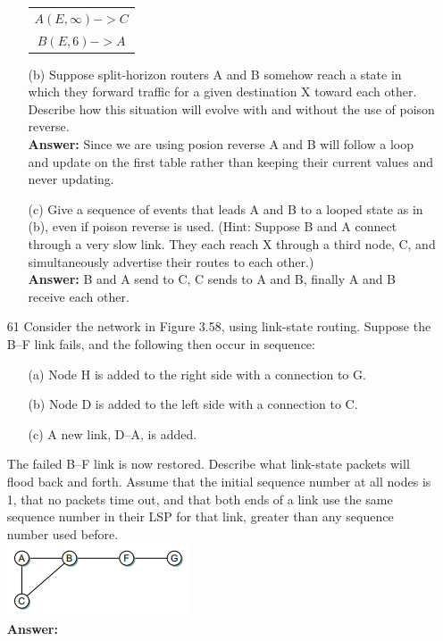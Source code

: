 \documentclass[a4paper]{article}
\begin{document}
\begin{itemize}
\begin{itemize}
\begin{tabular}{c}
	      	      	$A(E, \infty)->C$ \\
	      	      	$B(E, 6)->A$      \\
	      	      \end{tabular}
	      	\item[(b)] Suppose split-horizon routers A and B somehow reach a state in which they forward traffic for a given destination X toward each other. Describe how this situation will evolve with and without the use of poison reverse. \\
	      	      \textbf{Answer:} Since we are using posion reverse A and B will follow a loop and update on the first table rather than keeping their current values and never updating.
	      	\item[(c)] Give a sequence of events that leads A and B to a looped state as in (b), even if poison reverse is used. (Hint: Suppose B and A connect through a very slow link. They each reach X through a third node, C, and simultaneously advertise their routes to each other.) \\
	      	      \textbf{Answer:} B and A send to C, C sends to A and B, finally A and B receive each other.
	      \end{itemize}	
	\item[61] Consider the network in Figure 3.58, using link-state routing. Suppose the B–F link fails, and the following then occur in sequence:
	      \begin{itemize}
	      	\item[(a)] Node H is added to the right side with a connection to G.
	      	\item[(b)] Node D is added to the left side with a connection to C.
	      	\item[(c)] A new link, D–A, is added. 
	      \end{itemize} 
	      The failed B–F link is now restored. Describe what link-state packets will flood back and forth. Assume that the initial sequence number at all nodes is 1, that no packets time out, and that both ends of a link use the same sequence number in their LSP for that link, greater than any sequence number used before. \\
	      \includegraphics{3-61.png} \\
	      \textbf{Answer:} 

\end{itemize}
\end{document}

